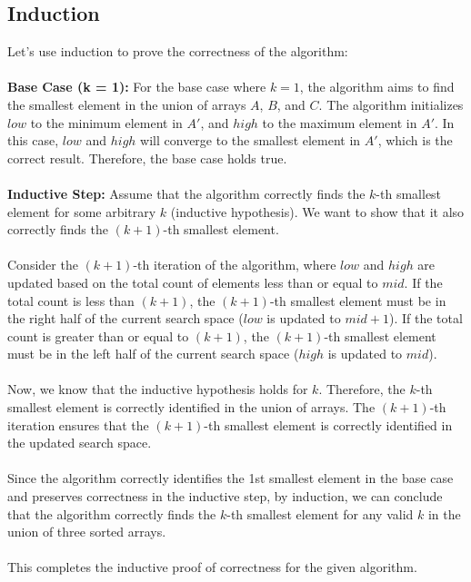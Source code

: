\documentclass{article}
\begin{document}
\subsection{Induction}
Let's use induction to prove the correctness of the algorithm:
\\\\
\textbf{Base Case (k = 1):}
For the base case where $k = 1$, the algorithm aims to find the smallest element in the union of arrays $A$, $B$, and $C$. The algorithm initializes $low$ to the minimum element in $A'$, and $high$ to the maximum element in $A'$. In this case, $low$ and $high$ will converge to the smallest element in $A'$, which is the correct result. Therefore, the base case holds true.
\\\\
\textbf{Inductive Step:}
Assume that the algorithm correctly finds the $k$-th smallest element for some arbitrary $k$ (inductive hypothesis). We want to show that it also correctly finds the $(k+1)$-th smallest element.
\\\\
Consider the $(k+1)$-th iteration of the algorithm, where $low$ and $high$ are updated based on the total count of elements less than or equal to $mid$. If the total count is less than $(k+1)$, the $(k+1)$-th smallest element must be in the right half of the current search space ($low$ is updated to $mid + 1$). If the total count is greater than or equal to $(k+1)$, the $(k+1)$-th smallest element must be in the left half of the current search space ($high$ is updated to $mid$).
\\\\
Now, we know that the inductive hypothesis holds for $k$. Therefore, the $k$-th smallest element is correctly identified in the union of arrays. The $(k+1)$-th iteration ensures that the $(k+1)$-th smallest element is correctly identified in the updated search space.
\\\\
Since the algorithm correctly identifies the 1st smallest element in the base case and preserves correctness in the inductive step, by induction, we can conclude that the algorithm correctly finds the $k$-th smallest element for any valid $k$ in the union of three sorted arrays.
\\\\
This completes the inductive proof of correctness for the given algorithm.
\end{document}
